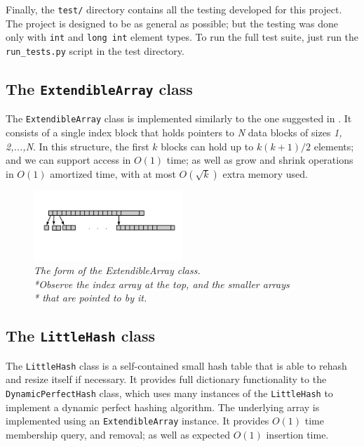 \documentclass[10pt,a4paper]{article}
\begin{document}
Finally, the \verb|test/| directory contains all the testing developed for this project.
The project is designed to be as general as possible; but the testing was done only with
\verb|int| and \verb|long int| element types. To run the full test suite, just run the
\verb|run_tests.py| script in the test directory.

\subsection{The \texttt{ExtendibleArray} class}

The \verb|ExtendibleArray| class is implemented similarly to the one suggested in
\cite{brodnik99}. It consists of a single index block that holds pointers to \emph{N}
data blocks of sizes \emph{1, 2,...,N}. In this structure, the first \(k\) blocks can
hold up to \(k(k+1)/2\) elements; and we can support access in \(O(1)\) time; as well
as grow and shrink operations in \(O(1)\) amortized time, with at most \(O(\sqrt{k})\)
extra memory used.

\begin{figure}[h!]
  \centering
\captionsetup{justification=centering}
  \includegraphics[width=0.5\textwidth]{ea_figure}
\caption{\emph{The form of the ExtendibleArray class. \\*Observe the index array at the top,
and the smaller arrays\\* that are pointed to by it.}}
\end{figure}

\subsection{The \texttt{LittleHash} class}
The \texttt{LittleHash} class is a self-contained small hash table that is able to
rehash and resize itself if necessary. It provides full dictionary functionality to the
\texttt{DynamicPerfectHash} class, which uses many instances of the \texttt{LittleHash}
to implement a dynamic perfect hashing algorithm. The underlying array is implemented
using an \texttt{ExtendibleArray} instance. It provides \(O(1)\) time membership query, and 
removal; as well as expected \(O(1)\) insertion time.
\end{document}
